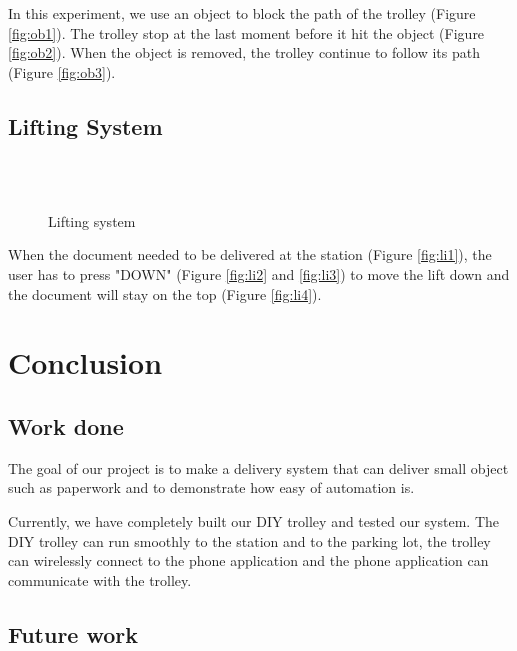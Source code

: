 \documentclass[12pt]{article}
\begin{document}
In this experiment, we use an object to block the path of the trolley (Figure \ref{fig:ob1}). The trolley stop at the last moment before it hit the object (Figure \ref{fig:ob2}). When the object is removed, the trolley continue to follow its path (Figure \ref{fig:ob3}). 

\subsection{Lifting System} \label{subsec:lifting}

\begin{figure}[H]
	\centering
	\subfloat[ 
	\label{fig:li1}]{\texttt{[image: li1]}} \hspace{1cm}
	\subfloat[ 
	\label{fig:li2}]{\texttt{[image: li2]}} \\ \vspace{0.5cm}
	\subfloat[ 
	\label{fig:li3}]{\texttt{[image: li3]}}
	\hspace{1cm}
	\subfloat[
	\label{fig:li4}]{\texttt{[image: li4]}} \\ 
	\caption{Lifting system} \label{fig:li}
\end{figure}

When the document needed to be delivered at the station (Figure \ref{fig:li1}), the user has to press "DOWN" (Figure \ref{fig:li2} and \ref{fig:li3}) to move the lift down and the document will stay on the top (Figure \ref{fig:li4}).

\section{Conclusion} \label{sec:conclusion}

\subsection{Work done} \label{subsec:workdone}

The goal of our project is to make a delivery system that can deliver small object such as paperwork and to demonstrate how easy of automation is.\par
Currently, we have completely built our DIY trolley and tested our system. The DIY trolley can run smoothly to the station and to the parking lot, the trolley can wirelessly connect to the phone application and the phone application can communicate with the trolley.

\subsection{Future work} \label{subsec:futurework}
\end{document}
